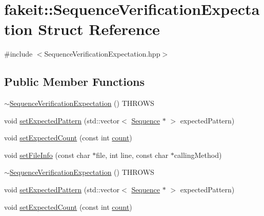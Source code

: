 \hypertarget{structfakeit_1_1SequenceVerificationExpectation}{}\section{fakeit\+::Sequence\+Verification\+Expectation Struct Reference}
\label{structfakeit_1_1SequenceVerificationExpectation}


{\ttfamily \#include $<$Sequence\+Verification\+Expectation.\+hpp$>$}

\subsection*{Public Member Functions}
\begin{DoxyCompactItemize}
\item 
\mbox{\hyperlink{structfakeit_1_1SequenceVerificationExpectation_a2378bd3fa4b42806ced08be01261d9ab}{$\sim$\+Sequence\+Verification\+Expectation}} () T\+H\+R\+O\+WS
\item 
void \mbox{\hyperlink{structfakeit_1_1SequenceVerificationExpectation_acf31012cd30a4213e3fb927549525c7d}{set\+Expected\+Pattern}} (std\+::vector$<$ \mbox{\hyperlink{classfakeit_1_1Sequence}{Sequence}} $\ast$ $>$ expected\+Pattern)
\item 
void \mbox{\hyperlink{structfakeit_1_1SequenceVerificationExpectation_aeb5a9670fec5f1c6174bd5206074d428}{set\+Expected\+Count}} (const int \mbox{\hyperlink{gmock__stress__test_8cc_afd9db40e3361ae09188795e8cbe19752}{count}})
\item 
void \mbox{\hyperlink{structfakeit_1_1SequenceVerificationExpectation_af6ca6f44173d64798ddc99d494c40c2f}{set\+File\+Info}} (const char $\ast$file, int line, const char $\ast$calling\+Method)
\item 
\mbox{\hyperlink{structfakeit_1_1SequenceVerificationExpectation_a2378bd3fa4b42806ced08be01261d9ab}{$\sim$\+Sequence\+Verification\+Expectation}} () T\+H\+R\+O\+WS
\item 
void \mbox{\hyperlink{structfakeit_1_1SequenceVerificationExpectation_acf31012cd30a4213e3fb927549525c7d}{set\+Expected\+Pattern}} (std\+::vector$<$ \mbox{\hyperlink{classfakeit_1_1Sequence}{Sequence}} $\ast$ $>$ expected\+Pattern)
\item 
void \mbox{\hyperlink{structfakeit_1_1SequenceVerificationExpectation_aeb5a9670fec5f1c6174bd5206074d428}{set\+Expected\+Count}} (const int \mbox{\hyperlink{gmock__stress__test_8cc_afd9db40e3361ae09188795e8cbe19752}{count}})

\end{DoxyCompactItemize}
